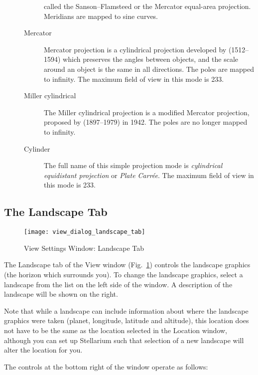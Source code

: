 \begin{description}
\begin{description}
    called the Sanson--Flamsteed or the Mercator equal-area
    projection. Meridians are mapped to sine curves.
  \item[Mercator] Mercator projection is a cylindrical projection developed 
    by  (1512--1594)
    which preserves the angles between objects, and the scale around
    an object is the same in all directions. The poles are mapped to
    infinity.  The maximum field of view in this mode is 233\degree.
  \item[Miller cylindrical] The Miller cylindrical projection is a
    modified Mercator projection, proposed by 
    (1897--1979) in 1942. The poles are no longer mapped to
    infinity.
  \item[Cylinder] The full name of this simple projection mode is
    \emph{cylindrical equidistant projection} or \emph{Plate
      Carr\'ee}. The maximum field of view in this mode is 233\degree.
  \end{description}
\end{description}

\subsection{The Landscape Tab}
\label{sec:gui:view:landscape}

\begin{figure}[t]
\centering\texttt{[image: view\_dialog\_landscape\_tab]}
\caption{View Settings Window: Landscape Tab}
\label{fig:gui:view:landscape}
\end{figure}

The Landscape tab of the View window
(Fig.~\ref{fig:gui:view:landscape}) controls the landscape graphics
(the horizon which surrounds you). To change the landscape graphics,
select a landscape from the list on the left side of the window. A
description of the landscape will be shown on the right.

Note that while a landscape  can include information about where the
landscape graphics were taken (planet, longitude, latitude and
altitude), this location does not have to be the same as the location
selected in the Location window, although you can set up Stellarium such
that selection of a new landscape will alter the location for you.

The controls at the bottom right of the window operate as follows:

